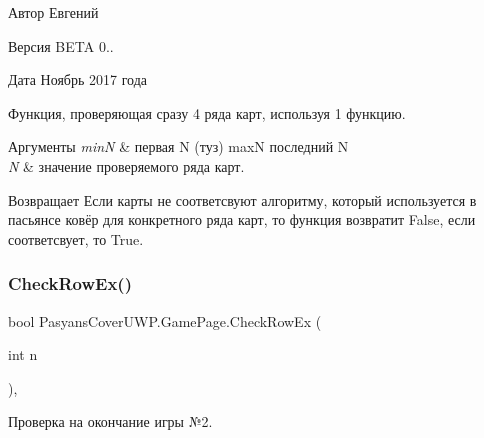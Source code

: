 \begin{DoxyAuthor}{Автор}
Евгений 
\end{DoxyAuthor}
\begin{DoxyVersion}{Версия}
B\+E\+TA 0.. 
\end{DoxyVersion}
\begin{DoxyDate}{Дата}
Ноябрь 2017 года
\end{DoxyDate}
Функция, проверяющая сразу 4 ряда карт, используя 1 функцию. 
\begin{DoxyParams}{Аргументы}
{\em minN} & первая N (туз)  maxN последний N \\
\hline
{\em N} & значение проверяемого ряда карт. \\
\hline
\end{DoxyParams}
\begin{DoxyReturn}{Возвращает}
Если карты не соответсвуют алгоритму, который используется в пасьянсе ковёр для конкретного ряда карт, то функция возвратит False, если соответсвует, то True. 
\end{DoxyReturn}
\mbox{\label{class_pasyans_cover_u_w_p_1_1_game_page_acfb646ae22c904f6afb4b226b7d8188e}} 
\subsubsection{\texorpdfstring{Check\+Row\+Ex()}{CheckRowEx()}}
{\footnotesize\ttfamily bool Pasyans\+Cover\+U\+W\+P.\+Game\+Page.\+Check\+Row\+Ex (\begin{DoxyParamCaption}\item[{int}]{n }\end{DoxyParamCaption})\hspace{0.3cm}{\ttfamily [inline]}, {\ttfamily [private]}}



Проверка на окончание игры №2. 

